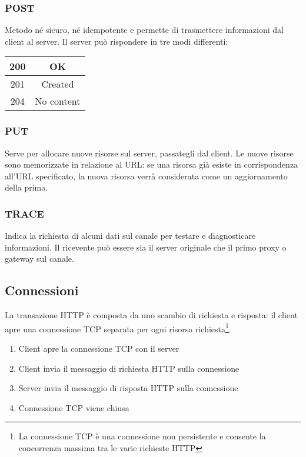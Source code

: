 \documentclass[a4paper,11pt]{article}
\begin{document}
\subsubsection{POST}
Metodo né sicuro, né idempotente e permette di trasmettere informazioni dal client al server.\newline
Il server può rispondere in tre modi differenti:
\begin{center}
    \begin{tabular}{c|c}
        200 & OK\\
        \hline
        201 & Created\\
        \hline
        204 & No content\\
    \end{tabular}
\end{center}
\subsubsection{PUT}
Serve per allocare nuove risorse sul server, passategli dal client.\newline
Le nuove risorse sono memorizzate in relazione al URL: se una risorsa già esiste in corrispondenza all’URL specificato, la nuova risorsa verrà considerata come un aggiornamento della prima.
\subsubsection{TRACE}
Indica la richiesta di alcuni dati sul canale per testare e diagnosticare informazioni. Il ricevente può essere sia il server originale che il primo proxy o gateway sul canale.
\subsection{Connessioni}
La transazione HTTP è composta da uno scambio di richiesta e risposta: il client apre una connessione TCP separata per ogni risorsa richiesta\footnote{La connessione TCP è una connessione non persistente e consente la concorrenza massima tra le varie richieste HTTP}.
\begin{enumerate}
    \item Client apre la connessione TCP con il server
    \item Client invia il messaggio di richiesta HTTP sulla connessione
    \item Server invia il messaggio di risposta HTTP sulla connessione
    \item Connessione TCP viene chiusa
\end{enumerate}
\end{document}
